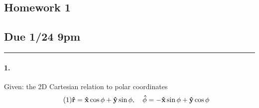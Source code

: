 \documentclass[../hw.tex]{subfiles}
\begin{document}
\begin{center}
    \section*{Homework 1}
    \subsection*{Due 1/24 9pm}
\end{center}
\hrule \vspace{10px}
\paragraph{1.} Given: the 2D Cartesian relation to polar coordinates
\begin{align*} \tag{1} \label{eq:1}
    \vu{r} = \vu{x} \cos \phi + \vu{y} \sin \phi, \quad
    \vu{\phi} = -\vu{x} \sin \phi + \vu{y} \cos \phi
\end{align*}
\end{document}
